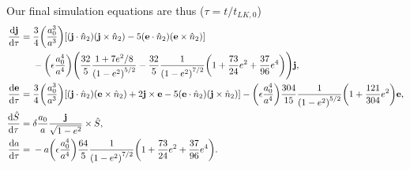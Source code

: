 \documentclass[11pt,
        usenames, %
        dvipsnames %
    ]{article}
\newcommand*{\rd}[2]{\frac{\mathrm{d}#1}{\mathrm{d}#2}}
\newcommand*{\bm}[1]{\boldsymbol{\mathbf{#1}}}
\DeclarePairedDelimiter\p{\lparen}{\rparen}
\DeclarePairedDelimiter\s{\lbrack}{\rbrack}
\begin{document}
Our final simulation equations are thus ($\tau = t / t_{LK, 0}$)
\begin{align}
    \rd{\bm{j}}{\tau} ={}& \frac{3}{4}\p*{\frac{a_0^3}{a^3}} \s*{
        \p*{\bm{j} \cdot \hat{n}_2} \p*{\bm{j} \times \hat{n}_2}
        - 5\p*{\bm{e} \cdot \hat{n}_2}\p*{\bm{e} \times \hat{n}_2}
        }\nonumber\\
        &- \p*{\epsilon \frac{a_0^4}{a^4}}\p*{
            \frac{32}{5}
                \frac{1 + 7e^2/8}{\p*{1 - e^2}^{5/2}}
            - \frac{32}{5} \frac{1}{\p*{1 - e^2}^{7/2}}\p*{1 + \frac{73}{24}e^2
                    + \frac{37}{96}e^4}
            }\bm{j},\\
    \rd{\bm{e}}{\tau} ={}&
        \frac{3}{4}\p*{\frac{a_0^3}{a^3}} \s*{
            \p*{\bm{j} \cdot \hat{n}_2} \p*{\bm{e} \times \hat{n}_2}
            + 2\bm{j} \times \bm{e}
            - 5\p*{\bm{e} \cdot \hat{n}_2}\p*{\bm{j} \times \hat{n}_2}
            }
        -
            \p*{\epsilon\frac{a_0^4}{a^4}}
            \frac{304}{15}
            \frac{1}{\p*{1 - e^2}^{5/2}}
            \p*{1 + \frac{121}{304} e^2}\bm{e},\\
    \rd{\hat{S}}{\tau} ={}& \delta \frac{a_0}{a}
        \frac{\bm{j}}{\sqrt{1 - e^2}} \times \hat{S},\\
    \rd{a}{\tau} ={}& -a\p*{\epsilon\frac{a_0^4}{a^4}}
        \frac{64}{5} \frac{1}{\p*{1 - e^2}^{7/2}}\p*{1 + \frac{73}{24}e^2
            + \frac{37}{96}e^4}.
\end{align}
\end{document}
